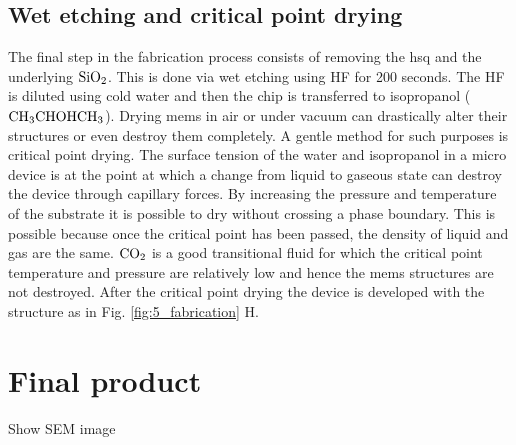 \documentclass[../report.tex]{subfiles}
\begin{document}
\subsection{Wet etching and critical point drying}
The final step in the fabrication process consists of removing the \gls{hsq} and the underlying $\mathrm{SiO_2}$. This is done via wet etching using HF for 200 seconds. The HF is diluted using cold water and then the chip is transferred to isopropanol ($\mathrm{CH_3CHOHCH_3}$). Drying \gls{mems} in air or under vacuum can drastically alter their structures or even destroy them completely. A gentle method for such purposes is critical point drying. The surface tension of the water and isopropanol in a micro device is at the point at which a change from liquid to gaseous state can destroy the device through capillary forces. By increasing the pressure and temperature of the substrate it is possible to dry without crossing a phase boundary. This is possible because once the critical point has been passed, the density of liquid and gas are the same. $\mathrm{CO_2}$ is a good transitional fluid for which the critical point temperature and pressure are relatively low and hence the \gls{mems} structures are not destroyed. After the critical point drying the device is developed with the structure as in Fig. \ref{fig:5_fabrication} H. 

\section{Final product}

Show SEM image
\end{document}
